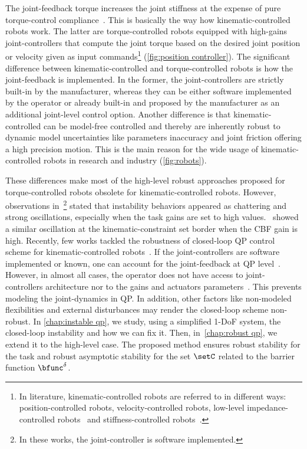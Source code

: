 The joint-feedback torque increases the joint stiffness at the expense of pure torque-control compliance~\cite{englsberger2014humanoids,englsberger2018icra}. This is basically the way how kinematic-controlled robots work. The latter are torque-controlled robots equipped with high-gains joint-controllers that compute the joint torque based on the desired joint position or velocity given as input commands\footnote{In literature, kinematic-controlled robots are referred to in different ways: position-controlled robots, velocity-controlled robots, low-level impedance-controlled robots~\cite{yang2018humanoids,iskandar2020iros} and stiffness-controlled robots~\cite{pang2021arxiv}.} (\cref{fig:position controller}). The significant difference between kinematic-controlled and torque-controlled robots is how the joint-feedback is implemented. In the former, the joint-controllers are strictly built-in by the manufacturer, whereas they can be either software implemented by the operator or already built-in and proposed by the manufacturer as an additional joint-level control option. Another difference is that kinematic-controlled can be model-free controlled and thereby are inherently robust to dynamic model uncertainties like parameters inaccuracy and joint friction offering a high precision motion. This is the main reason for the wide usage of kinematic-controlled robots in research and industry (\cref{fig:robots}). 

These differences make most of the high-level robust approaches proposed for torque-controlled robots obsolete for kinematic-controlled robots. However,  observations in~\cite{feng2014humanoids,feng2015journalOfFieldRobotics,johnson2015journalOfFieldRobotics,dedonato2017frontiers}\footnote{In these works, the joint-controller is software implemented.} stated that instability behaviors appeared as chattering and strong oscillations, especially when the task gains are set to high values.~\cite{singletary2022csl} showed a similar oscillation at the kinematic-constraint set border when the CBF gain is high.  
Recently, few works tackled the robustness of closed-loop QP control scheme for kinematic-controlled robots~\cite{singletary2022csl,singletary2022arxiv,molnar2022ral}. If the joint-controllers are software implemented or known, one can account for the joint-feedback at QP level~\cite{cisneros2018iros,lee2022frontiersRobS,singletary2022csl}. 
However, in almost all cases, the operator does not have access to joint-controllers architecture nor to the gains and actuators parameters~\cite{kim2016humanoids}. This prevents modeling the joint-dynamics in QP. In addition, other factors like non-modeled flexibilities and external disturbances may render the closed-loop scheme non-robust. In \cref{chap:instable qp}, we study, using a simplified 1-DoF system, the closed-loop instability and how we can fix it. Then, in~\cref{chap:robust qp}, we extend it to the high-level case. The proposed method ensures robust stability for the task and robust asymptotic stability for the set $\setC$ related to the barrier function $\bfunc^{\delta}$.  

